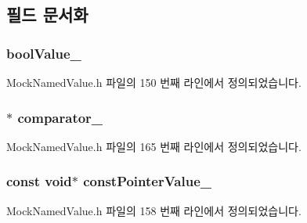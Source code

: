 \subsection{필드 문서화}
\subsubsection[{\texorpdfstring{bool\+Value\+\_\+}{boolValue_}}]{ bool\+Value\+\_\+}\hypertarget{class_mock_named_value_a09abee451cc622d483014dedcec24e58}{}\label{class_mock_named_value_a09abee451cc622d483014dedcec24e58}


Mock\+Named\+Value.\+h 파일의 150 번째 라인에서 정의되었습니다.

\subsubsection[{\texorpdfstring{comparator\+\_\+}{comparator_}}]{$\ast$ comparator\+\_\+\hspace{0.3cm}{\ttfamily [private]}}\hypertarget{class_mock_named_value_ab6a2a3a4434b05754363c3c0137ffeb1}{}\label{class_mock_named_value_ab6a2a3a4434b05754363c3c0137ffeb1}


Mock\+Named\+Value.\+h 파일의 165 번째 라인에서 정의되었습니다.

\subsubsection[{\texorpdfstring{const\+Pointer\+Value\+\_\+}{constPointerValue_}}]{\setlength{\rightskip}{0pt plus 5cm}const void$\ast$ const\+Pointer\+Value\+\_\+}\hypertarget{class_mock_named_value_a38076acabeb10cc2757cabdb9365b46e}{}\label{class_mock_named_value_a38076acabeb10cc2757cabdb9365b46e}


Mock\+Named\+Value.\+h 파일의 158 번째 라인에서 정의되었습니다.

